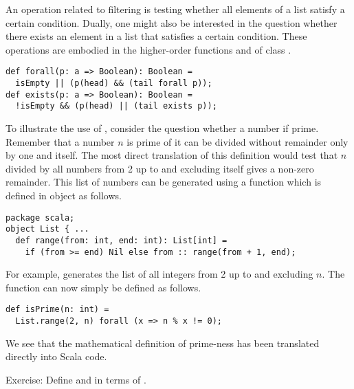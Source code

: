 An operation related to filtering is testing whether all elements of a
list satisfy a certain condition. Dually, one might also be interested
in the question whether there exists an element in a list that
satisfies a certain condition. These operations are embodied in the
higher-order functions  and  of class
.
\begin{lstlisting}
def forall(p: a => Boolean): Boolean =
  isEmpty || (p(head) && (tail forall p));
def exists(p: a => Boolean): Boolean =
  !isEmpty && (p(head) || (tail exists p));
\end{lstlisting}
To illustrate the use of , consider the question whether
a number if prime. Remember that a number $n$ is prime of it can be
divided without remainder only by one and itself. The most direct
translation of this definition would test that $n$ divided by all
numbers from 2 up to and excluding itself gives a non-zero
remainder. This list of numbers can be generated using a function
 which is defined in object  as follows.
\begin{lstlisting}
package scala;
object List { ... 
  def range(from: int, end: int): List[int] = 
    if (from >= end) Nil else from :: range(from + 1, end);
\end{lstlisting}
For example, 
generates the list of all integers from 2 up to and excluding $n$.
The function  can now simply be defined as follows.
\begin{lstlisting}
def isPrime(n: int) = 
  List.range(2, n) forall (x => n % x != 0);
\end{lstlisting}
We see that the mathematical definition of prime-ness has been
translated directly into Scala code. 

Exercise: Define  and  in terms of .


